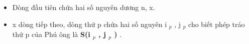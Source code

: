 \begin{itemize}
	\item Dòng đầu tiên chứa hai số nguyên dương n, x.
	\item x dòng tiếp theo, dòng thứ p chứa hai số nguyên i $_ p $ , j $_ p $ cho biết phép tráo thứ p của Phú ông là \textbf{ S(i $_ p $ , j $_ p $ ) } .
\end{itemize}